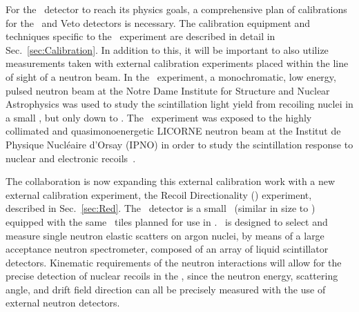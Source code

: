 
For the \DSk\ detector to reach its physics goals, a comprehensive plan of calibrations for the \LArTPC\ and Veto detectors is necessary.  The calibration equipment and techniques specific to the \DSks\ experiment are described in detail in Sec.~\ref{sec:Calibration}.  In addition to this, it will be important to also utilize measurements taken with external calibration experiments placed within the line of sight of a neutron beam.  In the \SCENE\ experiment,\cite{Cao:2015ks,Alexander:2013ke} a monochromatic, low energy, pulsed neutron beam at the Notre Dame Institute for Structure and Nuclear Astrophysics was used to study the scintillation light yield from recoiling nuclei in a small \LArTPC, but only down to \SCENERecoilsEnergyMax.  The \ARIS\ experiment was exposed to the highly collimated and quasimonoenergetic LICORNE neutron beam at the Institut de Physique Nucl\'eaire d'Orsay (IPNO) in order to study the scintillation response to nuclear and electronic recoils~\cite{Agnes:2018cn}.

The collaboration is now expanding this external calibration work with a new external calibration experiment, the Recoil Directionality (\ReD ) experiment, described in Sec.~\ref{sec:Red}. The \ReD\ detector is a small \LArTPC\ (similar in size to \SCENE ) equipped with the same \SiPM\ tiles planned for use in \DSks. \ReD\ is designed to select and measure single neutron elastic scatters on argon nuclei, by means of a large acceptance neutron spectrometer, composed of an array of liquid scintillator detectors.  Kinematic requirements of the neutron interactions will allow for the precise detection of nuclear recoils in the \LAr, since the neutron energy, scattering angle, and drift field direction can all be precisely measured with the use of external neutron detectors.

